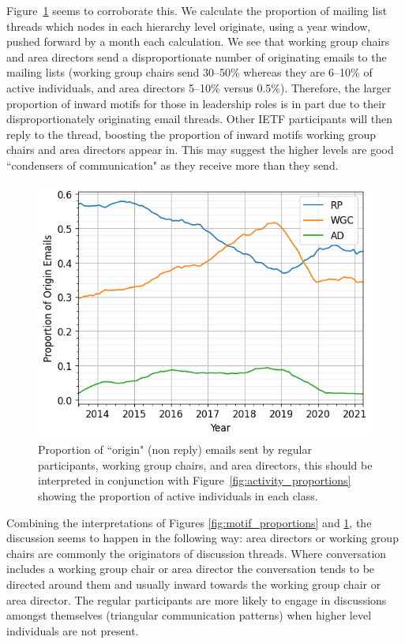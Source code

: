 \documentclass[twocolumn,10pt]{article}
\newlength{\figureWidthOneColumn}
\newcommand{\pb}[1]{\vspace{0.75ex}\noindent{\textbf{#1}}}
\begin{document}
Figure~\ref{fig:origin_emails} seems to corroborate this. We calculate the
proportion of mailing list threads which nodes in each hierarchy level
originate, using a year window, pushed forward by a month each calculation.
We see that working group chairs and area directors send a disproportionate
number of originating emails to the mailing lists (working group chairs
send 30--50\% whereas they are 6--10\% of active individuals, and area
directors 5--10\% versus 0.5\%). 
Therefore, the larger proportion of inward motifs for those in leadership
roles is in part due to their disproportionately originating email threads.
Other IETF participants will then reply to the thread, boosting the
proportion of inward motifs working group chairs and area directors appear
in. This may suggest the higher levels are good ``condensers of
communication" as they receive more than they send.

\begin{figure}[t]
  \centering
  \includegraphics[width=\figureWidthOneColumn]{figures-prev/icwsm-2024/Origin_email_proportions.png}
  \caption{
    Proportion of ``origin" (non reply) emails sent by regular
    participants, working group chairs, and area directors, this should be
    interpreted in conjunction with Figure~\ref{fig:activity_proportions}
    showing the proportion of active individuals in each class.
  }
  \label{fig:origin_emails}
\end{figure}

\pb{Summary:}
Combining the interpretations of Figures \ref{fig:motif_proportions} and
\ref{fig:origin_emails}, the discussion seems to happen in the following
way: area directors or working group chairs are commonly the originators
of discussion threads. Where conversation includes a working group chair
or area director the conversation tends to be directed around them and
usually inward towards the working group chair or area director. The
regular participants are more likely to engage in discussions amongst
themselves (triangular communication patterns) when higher level
individuals are not present. 
\end{document}
